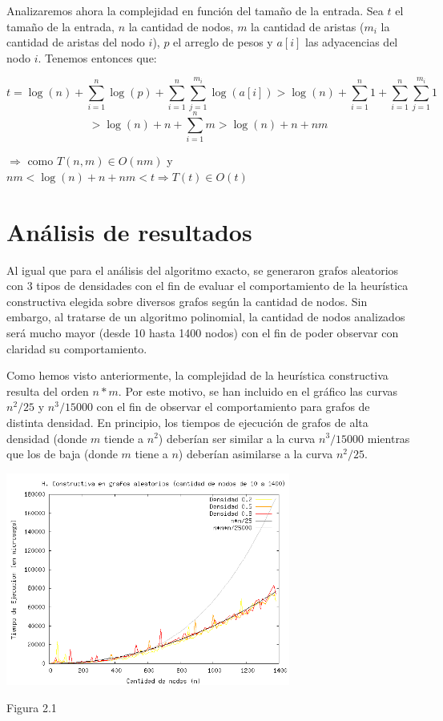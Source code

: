 \documentclass[a4paper,11pt] {article}
\begin{document}
Analizaremos ahora la complejidad en funci\'on del tama\~{n}o de la entrada. Sea $t$ el tama\~{n}o de la entrada, $n$ la cantidad de nodos, $m$ la cantidad de aristas ($m_i$ la cantidad de aristas del nodo $i$), $p$ el arreglo de pesos y $a[i]$ las adyacencias del nodo $i$. Tenemos entonces que:

$$t=\log(n)+\sum_{i=1}^{n}\log(p)+\sum_{i=1}^{n}\sum_{j=1}^{m_i}\log(a[i])>\log(n)+\sum_{i=1}^{n}1+\sum_{i=1}^{n}\sum_{j=1}^{m_i}1$$
$$>\log(n)+n+\sum_{i=1}^{n}m>\log(n)+n+nm$$

\hspace{20pt} $\Longrightarrow$ como $T(n,m) \in O(nm)$ y $nm<\log(n)+n+nm<t \Longrightarrow T(t) \in O(t)$

\section*{An\'alisis de resultados}

Al igual que para el análisis del algoritmo exacto, se generaron grafos aleatorios con 3 tipos de densidades con el fin de evaluar el comportamiento de la heurística constructiva elegida sobre diversos grafos según la cantidad de nodos. Sin embargo, al tratarse de un algoritmo polinomial, la cantidad de nodos analizados será mucho mayor (desde 10 hasta 1400 nodos) con el fin de poder observar con claridad su comportamiento.

Como hemos visto anteriormente, la complejidad de la heurística constructiva resulta del orden $n*m$. Por este motivo, se han incluido en el gráfico las curvas $n^2/25$ y $n^3/15000$ con el fin de observar el comportamiento para grafos de distinta densidad. En principio, los tiempos de ejecución de grafos de alta densidad (donde $m$ tiende a $n^2$) deberían ser similar a la curva $n^3/15000$ mientras que los de baja (donde $m$ tiene a $n$) deberían asimilarse a la curva $n^2/25$.

\begin{center}
 \includegraphics[width=0.7\textwidth]{graficos/tiemposHC.png}
\begin{center}
Figura 2.1
\end{center}
\end{center}
\end{document}
